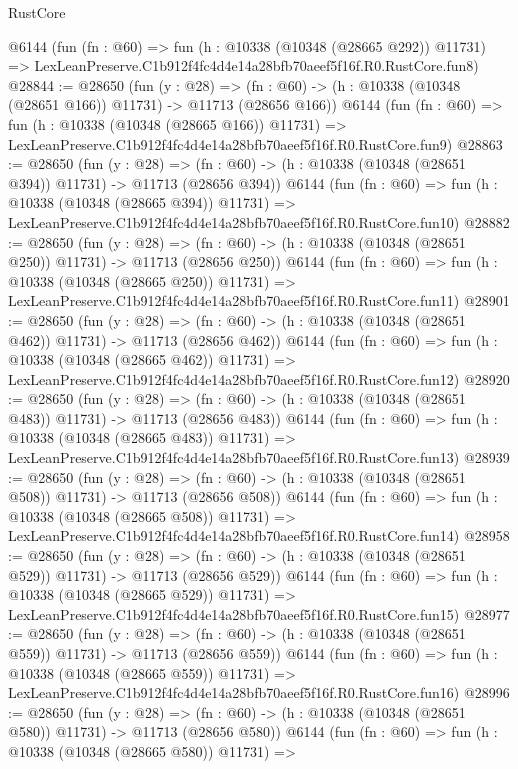 \begin{lexlean}{RustCore}
\begin{coremodule}
    @6144
    (fun (fn : @60) =>
    fun (h : @10338 (@10348 (@28665 @292)) @11731) =>
    LexLeanPreserve.C1b912f4fc4d4e14a28bfb70aeef5f16f.R0.RustCore.fun8)
@28844 := @28650
    (fun (y : @28) =>
    (fn : @60) -> (h : @10338 (@10348 (@28651 @166)) @11731) -> @11713 (@28656 @166))
    @6144
    (fun (fn : @60) =>
    fun (h : @10338 (@10348 (@28665 @166)) @11731) =>
    LexLeanPreserve.C1b912f4fc4d4e14a28bfb70aeef5f16f.R0.RustCore.fun9)
@28863 := @28650
    (fun (y : @28) =>
    (fn : @60) -> (h : @10338 (@10348 (@28651 @394)) @11731) -> @11713 (@28656 @394))
    @6144
    (fun (fn : @60) =>
    fun (h : @10338 (@10348 (@28665 @394)) @11731) =>
    LexLeanPreserve.C1b912f4fc4d4e14a28bfb70aeef5f16f.R0.RustCore.fun10)
@28882 := @28650
    (fun (y : @28) =>
    (fn : @60) -> (h : @10338 (@10348 (@28651 @250)) @11731) -> @11713 (@28656 @250))
    @6144
    (fun (fn : @60) =>
    fun (h : @10338 (@10348 (@28665 @250)) @11731) =>
    LexLeanPreserve.C1b912f4fc4d4e14a28bfb70aeef5f16f.R0.RustCore.fun11)
@28901 := @28650
    (fun (y : @28) =>
    (fn : @60) -> (h : @10338 (@10348 (@28651 @462)) @11731) -> @11713 (@28656 @462))
    @6144
    (fun (fn : @60) =>
    fun (h : @10338 (@10348 (@28665 @462)) @11731) =>
    LexLeanPreserve.C1b912f4fc4d4e14a28bfb70aeef5f16f.R0.RustCore.fun12)
@28920 := @28650
    (fun (y : @28) =>
    (fn : @60) -> (h : @10338 (@10348 (@28651 @483)) @11731) -> @11713 (@28656 @483))
    @6144
    (fun (fn : @60) =>
    fun (h : @10338 (@10348 (@28665 @483)) @11731) =>
    LexLeanPreserve.C1b912f4fc4d4e14a28bfb70aeef5f16f.R0.RustCore.fun13)
@28939 := @28650
    (fun (y : @28) =>
    (fn : @60) -> (h : @10338 (@10348 (@28651 @508)) @11731) -> @11713 (@28656 @508))
    @6144
    (fun (fn : @60) =>
    fun (h : @10338 (@10348 (@28665 @508)) @11731) =>
    LexLeanPreserve.C1b912f4fc4d4e14a28bfb70aeef5f16f.R0.RustCore.fun14)
@28958 := @28650
    (fun (y : @28) =>
    (fn : @60) -> (h : @10338 (@10348 (@28651 @529)) @11731) -> @11713 (@28656 @529))
    @6144
    (fun (fn : @60) =>
    fun (h : @10338 (@10348 (@28665 @529)) @11731) =>
    LexLeanPreserve.C1b912f4fc4d4e14a28bfb70aeef5f16f.R0.RustCore.fun15)
@28977 := @28650
    (fun (y : @28) =>
    (fn : @60) -> (h : @10338 (@10348 (@28651 @559)) @11731) -> @11713 (@28656 @559))
    @6144
    (fun (fn : @60) =>
    fun (h : @10338 (@10348 (@28665 @559)) @11731) =>
    LexLeanPreserve.C1b912f4fc4d4e14a28bfb70aeef5f16f.R0.RustCore.fun16)
@28996 := @28650
    (fun (y : @28) =>
    (fn : @60) -> (h : @10338 (@10348 (@28651 @580)) @11731) -> @11713 (@28656 @580))
    @6144
    (fun (fn : @60) =>
    fun (h : @10338 (@10348 (@28665 @580)) @11731) =>

\end{coremodule}
\end{lexlean}
